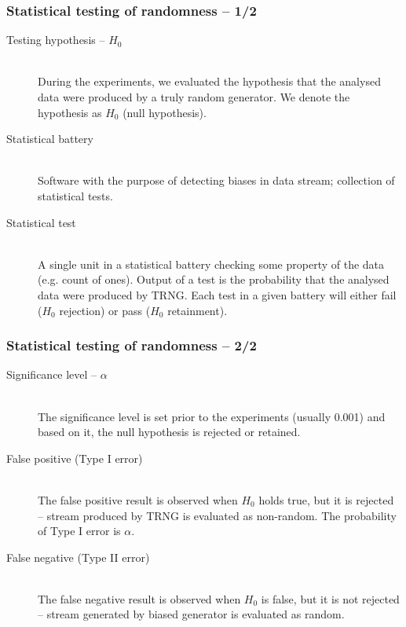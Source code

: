 \documentclass[aspectratio=169]{beamer}
\begin{document}
\begin{frame}
\frametitle{Statistical testing of randomness -- 1/2}

\begin{description}
\item[Testing hypothesis -- $H_0$] \hfill \\
During the experiments, we evaluated the hypothesis that the analysed data were
produced by a truly random generator. We denote the hypothesis as $H_0$ (null hypothesis).
\item[Statistical battery] \hfill \\
Software with the purpose of detecting biases in data stream; collection of statistical tests.
\item[Statistical test] \hfill \\
A single unit in a statistical battery checking some property of the data (e.g. count of ones). Output of a test is the probability that the analysed data were produced by TRNG. Each test in a given battery will either fail ($H_0$ rejection) or pass ($H_0$ retainment).
\end{description}

\end{frame}

\begin{frame}
\frametitle{Statistical testing of randomness -- 2/2}

\begin{description}
\item[Significance level -- $\alpha$] \hfill \\
The significance level is set prior to the experiments (usually 0.001) and based on it, the null hypothesis is rejected or retained.
\item[False positive (Type I error)] \hfill \\
The false positive result is observed when $H_0$ holds true, but it is rejected -- stream
produced by TRNG is evaluated as non-random. The probability of Type I error is $\alpha$.
\item[False negative (Type II error)] \hfill \\
The false negative result is observed when $H_0$ is false, but it is not rejected -- stream generated by biased generator is evaluated as random.
\end{description}
\end{frame}
\end{document}
